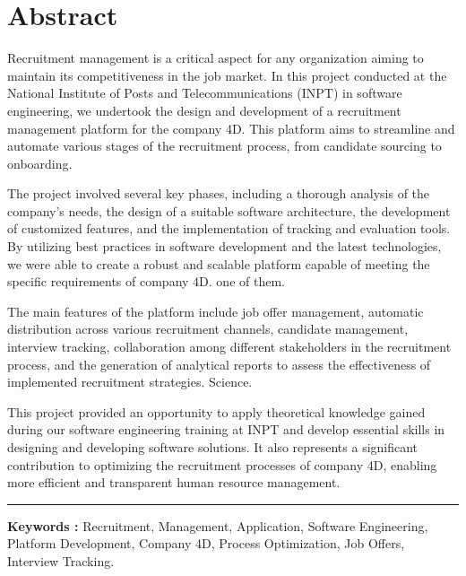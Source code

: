 \chapter*{Abstract}


\hspace{0.6cm}Recruitment management is a critical aspect for any organization 
aiming to maintain its competitiveness in the job market. In this project conducted at the National
 Institute of Posts and Telecommunications (INPT) in software engineering, we undertook the design and development
  of a recruitment management platform for the company 4D. This platform aims to streamline and automate various stages of the recruitment process, from candidate sourcing to onboarding.
\newline

The project involved several key phases, including a thorough analysis of the company's needs, the design of a suitable software architecture, the development of customized features, and the implementation of tracking and evaluation tools. By utilizing best practices in software development and the latest technologies, we were able to create a robust and scalable platform capable of meeting the specific requirements of company 4D.
one of them.
\newline

The main features of the platform include job offer management, automatic distribution across various recruitment channels, candidate management, interview tracking, collaboration among different stakeholders in the recruitment process, and the generation of analytical reports to assess the effectiveness of implemented recruitment strategies.
Science.
\newline

This project provided an opportunity to apply theoretical knowledge gained during our software engineering training at INPT and develop essential skills in designing and developing software solutions. It also represents a significant contribution to optimizing the recruitment processes of company 4D, enabling more efficient and transparent human resource management.
\newline




\vspace{1cm}
\noindent\rule[2pt]{\textwidth}{0.5pt}
\textbf{Keywords :} Recruitment, Management, Application, Software Engineering, Platform Development, Company 4D, Process Optimization, Job Offers, Interview Tracking.

